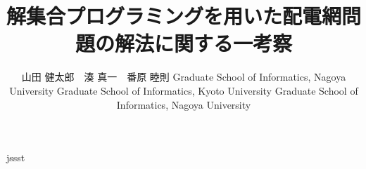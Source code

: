 \documentclass[T]{compsoft}
\begin{document}
\title{解集合プログラミングを用いた配電網問題の解法に関する一考察
}

%
\author{山田 健太郎　湊 真一　番原 睦則
%
%
%
%
%
{Graduate School of Informatics, Nagoya University}
%
{Graduate School of Informatics, Kyoto University}
%
{Graduate School of Informatics, Nagoya University}}



\maketitle \thispagestyle {empty}









 {jssst}
\end{document}
